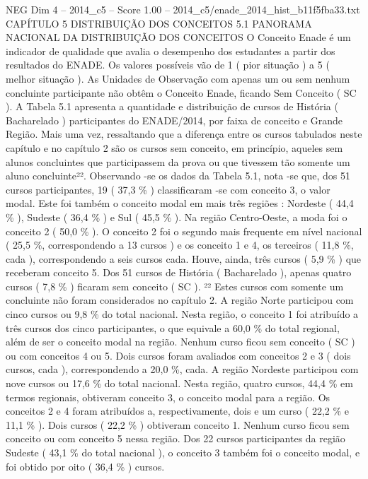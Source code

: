 \begin{textsample}{NEG Dim 4 – 2014\_c5 – Score 1.00 – 2014\_c5/enade\_2014\_hist\_b11f5fba33.txt}  \label{ex:f4_neg_200}
CAPÍTULO 5 DISTRIBUIÇÃO DOS CONCEITOS 5.1 PANORAMA NACIONAL DA DISTRIBUIÇÃO DOS CONCEITOS O Conceito Enade é um indicador de qualidade que avalia o desempenho dos estudantes a partir dos resultados do ENADE.
Os valores possíveis vão de 1 ( pior situação ) a 5 ( melhor situação ).
As Unidades de Observação com apenas um ou sem nenhum concluinte participante não obtêm o Conceito Enade, ficando Sem Conceito ( SC ).
A Tabela 5.1 apresenta a quantidade e distribuição de cursos de História ( Bacharelado ) participantes do ENADE/2014, por faixa de conceito e Grande Região.
Mais uma vez, ressaltando que a diferença entre os cursos tabulados neste capítulo e no capítulo 2 são os cursos sem conceito, em princípio, aqueles sem alunos concluintes que participassem da prova ou que tivessem tão somente um aluno concluinte²².
Observando -se os dados da Tabela 5.1, nota -se que, dos 51 cursos participantes, 19 ( 37,3 \% ) classificaram -se com conceito 3, o valor modal.
Este foi também o conceito modal em mais três regiões : Nordeste ( 44,4 \% ), Sudeste ( 36,4 \% ) e Sul ( 45,5 \% ).
Na região Centro-Oeste, a moda foi o conceito 2 ( 50,0 \% ).
O conceito 2 foi o segundo mais frequente em nível nacional ( 25,5 \%, correspondendo a 13 cursos ) e os conceito 1 e 4, os terceiros ( 11,8 \%, cada ), correspondendo a seis cursos cada.
Houve, ainda, três cursos ( 5,9 \% ) que receberam conceito 5.
Dos 51 cursos de História ( Bacharelado ), apenas quatro cursos ( 7,8 \% ) ficaram sem conceito ( SC ). ²² Estes cursos com somente um concluinte não foram considerados no capítulo 2.
A região Norte participou com cinco cursos ou 9,8 \% do total nacional.
Nesta região, o conceito 1 foi atribuído a três cursos dos cinco participantes, o que equivale a 60,0 \% do total regional, além de ser o conceito modal na região.
Nenhum curso ficou sem conceito ( SC ) ou com conceitos 4 ou 5.
Dois cursos foram avaliados com conceitos 2 e 3 ( dois cursos, cada ), correspondendo a 20,0 \%, cada.
A região Nordeste participou com nove cursos ou 17,6 \% do total nacional.
Nesta região, quatro cursos, 44,4 \% em termos regionais, obtiveram conceito 3, o conceito modal para a região.
Os conceitos 2 e 4 foram atribuídos a, respectivamente, dois e um curso ( 22,2 \% e 11,1 \% ).
Dois cursos ( 22,2 \% ) obtiveram conceito 1.
Nenhum curso ficou sem conceito ou com conceito 5 nessa região.
Dos 22 cursos participantes da região Sudeste ( 43,1 \% do total nacional ), o conceito 3 também foi o conceito modal, e foi obtido por oito ( 36,4 \% ) cursos.

\end{textsample}
